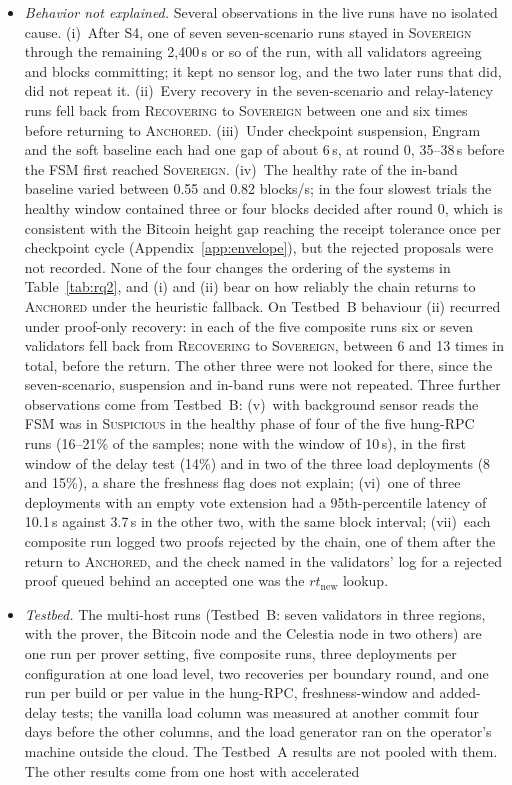 \begin{itemize}
  \item \emph{Behavior not explained.} Several observations in the live runs have no isolated cause. (i)~After S4, one of seven seven-scenario runs stayed in \textsc{Sovereign} through the remaining 2{,}400\,s or so of the run, with all validators agreeing and blocks committing; it kept no sensor log, and the two later runs that did, did not repeat it. (ii)~Every recovery in the seven-scenario and relay-latency runs fell back from \textsc{Recovering} to \textsc{Sovereign} between one and six times before returning to \textsc{Anchored}. (iii)~Under checkpoint suspension, Engram and the soft baseline each had one gap of about 6\,s, at round 0, 35--38\,s before the FSM first reached \textsc{Sovereign}. (iv)~The healthy rate of the in-band baseline varied between 0.55 and 0.82 blocks/s; in the four slowest trials the healthy window contained three or four blocks decided after round 0, which is consistent with the Bitcoin height gap reaching the receipt tolerance once per checkpoint cycle (Appendix~\ref{app:envelope}), but the rejected proposals were not recorded. None of the four changes the ordering of the systems in Table~\ref{tab:rq2}, and (i) and (ii) bear on how reliably the chain returns to \textsc{Anchored} under the heuristic fallback. On Testbed~B behaviour (ii) recurred under proof-only recovery: in each of the five composite runs six or seven validators fell back from \textsc{Recovering} to \textsc{Sovereign}, between 6 and 13 times in total, before the return. The other three were not looked for there, since the seven-scenario, suspension and in-band runs were not repeated. Three further observations come from Testbed~B: (v)~with background sensor reads the FSM was in \textsc{Suspicious} in the healthy phase of four of the five hung-RPC runs (16--21\% of the samples; none with the window of 10\,s), in the first window of the delay test (14\%) and in two of the three load deployments (8 and 15\%), a share the freshness flag does not explain; (vi)~one of three deployments with an empty vote extension had a 95th-percentile latency of 10.1\,s against 3.7\,s in the other two, with the same block interval; (vii)~each composite run logged two proofs rejected by the chain, one of them after the return to \textsc{Anchored}, and the check named in the validators' log for a rejected proof queued behind an accepted one was the $rt_{\text{new}}$ lookup.
  \item \emph{Testbed.} The multi-host runs (Testbed~B: seven validators in three regions, with the prover, the Bitcoin node and the Celestia node in two others) are one run per prover setting, five composite runs, three deployments per configuration at one load level, two recoveries per boundary round, and one run per build or per value in the hung-RPC, freshness-window and added-delay tests; the vanilla load column was measured at another commit four days before the other columns, and the load generator ran on the operator's machine outside the cloud. The Testbed~A results are not pooled with them. The other results come from one host with accelerated

\end{itemize}
